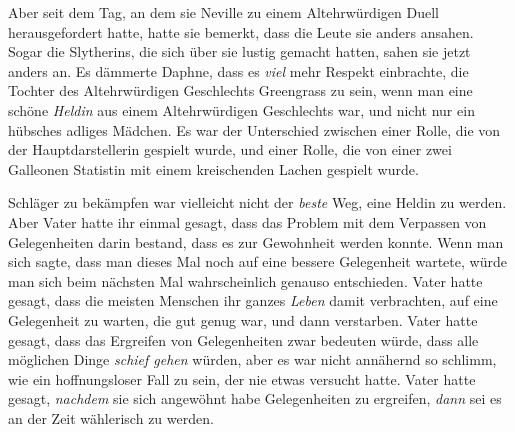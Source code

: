 Aber seit dem Tag, an dem sie Neville zu einem Altehrwürdigen Duell herausgefordert hatte, hatte sie bemerkt, dass die Leute sie anders ansahen. Sogar die Slytherins, die sich über sie lustig gemacht hatten, sahen sie jetzt anders an. Es dämmerte Daphne, dass es \emph{viel} mehr Respekt einbrachte, die Tochter des Altehrwürdigen Geschlechts Greengrass zu sein, wenn man eine schöne \emph{Heldin} aus einem Altehrwürdigen Geschlechts war, und nicht nur ein hübsches adliges Mädchen. Es war der Unterschied zwischen einer Rolle, die von der Hauptdarstellerin gespielt wurde, und einer Rolle, die von einer zwei Galleonen Statistin mit einem kreischenden Lachen gespielt wurde.

Schläger zu bekämpfen war vielleicht nicht der \emph{beste} Weg, eine Heldin zu werden. Aber Vater hatte ihr einmal gesagt, dass das Problem mit dem Verpassen von Gelegenheiten darin bestand, dass es zur Gewohnheit werden konnte. Wenn man sich sagte, dass man dieses Mal noch auf eine bessere Gelegenheit wartete, würde man sich beim nächsten Mal wahrscheinlich genauso entschieden. Vater hatte gesagt, dass die meisten Menschen ihr ganzes \emph{Leben} damit verbrachten, auf eine Gelegenheit zu warten, die gut genug war, und dann verstarben. Vater hatte gesagt, dass das Ergreifen von Gelegenheiten zwar bedeuten würde, dass alle möglichen Dinge \emph{schief gehen} würden, aber es war nicht annähernd so schlimm, wie ein hoffnungsloser Fall zu sein, der nie etwas versucht hatte. Vater hatte gesagt, \emph{nachdem} sie sich angewöhnt habe Gelegenheiten zu ergreifen, \emph{dann} sei es an der Zeit wählerisch zu werden.

